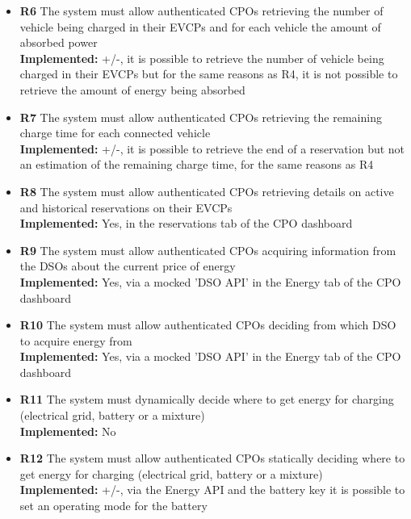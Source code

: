 \begin{itemize}
    \item        \textbf{R6}  The system must allow authenticated CPOs retrieving the number of vehicle being charged in their EVCPs and for each vehicle the amount of absorbed power \\
          \textbf{Implemented:} +/-, it is possible to retrieve the number of vehicle being charged in their EVCPs but for the same reasons as R4, it is not possible to retrieve the amount of energy being absorbed
    \item        \textbf{R7}  The system must allow authenticated CPOs retrieving the remaining charge time for each connected vehicle                                                 \\
          \textbf{Implemented:} +/-, it is possible to retrieve the end of a reservation but not an estimation of the remaining charge time, for the same reasons as R4
    \item        \textbf{R8}  The system must allow authenticated CPOs retrieving details on active and historical reservations on their EVCPs                                         \\
          \textbf{Implemented:} Yes, in the reservations tab of the CPO dashboard
    \item        \textbf{R9}  The system must allow authenticated CPOs acquiring information from the DSOs about the current price of energy                                           \\
          \textbf{Implemented:} Yes, via a mocked 'DSO API' in the Energy tab of the CPO dashboard
    \item        \textbf{R10} The system must allow authenticated CPOs deciding from which DSO to acquire energy from                                                                  \\
          \textbf{Implemented:} Yes, via a mocked 'DSO API' in the Energy tab of the CPO dashboard
    \item        \textbf{R11} The system must dynamically decide where to get energy for charging (electrical grid, battery or a mixture)                                              \\
          \textbf{Implemented:} No
    \item        \textbf{R12} The system must allow authenticated CPOs statically deciding where to get energy for charging (electrical grid, battery or a mixture)                    \\
          \textbf{Implemented:} +/-, via the Energy API and the battery key it is possible to set an operating mode for the battery

\end{itemize}
